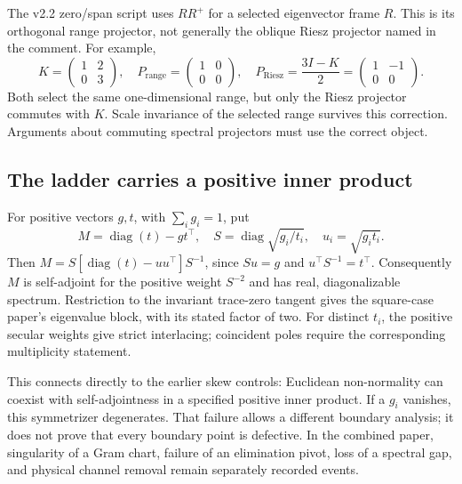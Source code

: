 \documentclass[11pt]{article}
\begin{document}
The v2.2 zero/span script uses $R R^+$ for a selected eigenvector frame $R$. This is its orthogonal range projector, not generally the oblique Riesz projector named in the comment. For example,
\begin{equation}
K=\begin{pmatrix}1&2\\0&3\end{pmatrix},\quad
P_{\mathrm{range}}=\begin{pmatrix}1&0\\0&0\end{pmatrix},\quad
P_{\mathrm{Riesz}}=\frac{3I-K}{2}=\begin{pmatrix}1&-1\\0&0\end{pmatrix}.
\end{equation}
Both select the same one-dimensional range, but only the Riesz projector commutes with $K$. Scale invariance of the selected range survives this correction. Arguments about commuting spectral projectors must use the correct object.

\subsection{The ladder carries a positive inner product}
For positive vectors $g,t$, with $\sum_i g_i=1$, put
\begin{equation}
M=\operatorname{diag}(t)-gt^\top,\quad
S=\operatorname{diag}\sqrt{g_i/t_i},\quad u_i=\sqrt{g_it_i}.
\end{equation}
Then $M=S[\operatorname{diag}(t)-uu^\top]S^{-1}$, since $Su=g$ and $u^\top S^{-1}=t^\top$. Consequently $M$ is self-adjoint for the positive weight $S^{-2}$ and has real, diagonalizable spectrum. Restriction to the invariant trace-zero tangent gives the square-case paper's eigenvalue block, with its stated factor of two. For distinct $t_i$, the positive secular weights give strict interlacing; coincident poles require the corresponding multiplicity statement.

This connects directly to the earlier skew controls: Euclidean non-normality can coexist with self-adjointness in a specified positive inner product. If a $g_i$ vanishes, this symmetrizer degenerates. That failure allows a different boundary analysis; it does not prove that every boundary point is defective. In the combined paper, singularity of a Gram chart, failure of an elimination pivot, loss of a spectral gap, and physical channel removal remain separately recorded events.
\end{document}
